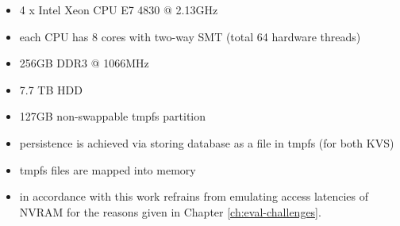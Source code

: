 \begin{itemize}
    \item 4 x Intel Xeon CPU E7 4830 @ 2.13GHz
    \item each CPU has 8 cores with two-way SMT (total 64 hardware threads)
    \item 256GB DDR3 @ 1066MHz
    \item 7.7 TB HDD
    \item 127GB non-swappable tmpfs partition
    \item persistence is achieved via storing database as a file in tmpfs (for both KVS)
    \item tmpfs files are mapped into memory
    \item in accordance with \cite{bailey2013exploring, zhou2016nvht} this work refrains from emulating access latencies of NVRAM for the reasons given in Chapter \ref{ch:eval-challenges}.
\end{itemize}
